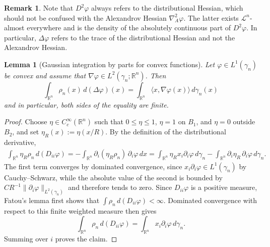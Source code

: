 \documentclass[11pt]{amsart}
\newtheorem{lemma}[lemma]{Lemma}
\theoremstyle{definition}
\newtheorem{remark}[remark]{Remark}
\newcommand{\R}{\mathbb{R}}
\newcommand{\tr}{\operatorname{tr}}
\begin{document}

\begin{remark}
Note that $D^2\varphi$ always refers to the
distributional Hessian, which should not be confused
with the Alexandrov Hessian $\nabla_A^2\varphi$. The latter  exists
$\mathcal L^n$-almost everywhere and is the density of the absolutely
continuous part of $D^2\varphi$. In particular, $\Delta\varphi$ refers to the trace of the distributional Hessian and not the Alexandrov Hessian.    
\end{remark}



\begin{lemma}[Gaussian integration by parts for convex functions]\label{lem:GaussPartInt}
Let $\varphi \in L^1(\gamma_n)$ be convex and assume that
$\nabla\varphi\in L^2(\gamma_n;\mathbb R^n)$. Then
\[
    \int_{\mathbb R^n} \rho_n(x)\,d(\Delta\varphi)(x)
    =
    \int_{\mathbb R^n}
        \langle x,\nabla\varphi(x)\rangle\,d\gamma_n(x)
\]
and in particular, both sides of the equality are finite. 
\end{lemma}
\begin{proof}
Choose $\eta\in C_c^\infty(\R^n)$ such that $0\leq\eta\leq1$,
$\eta=1$ on $B_1$, and $\eta=0$ outside $B_2$, and set
$\eta_R(x):=\eta(x/R)$. By the definition of the distributional
derivative,
\begin{align*}
  \int_{\R^n}\eta_R\rho_n\,d(D_{ii}\varphi)
  =-\int_{\R^n}\partial_i(\eta_R\rho_n)\,
    \partial_i\varphi\,dx
  =\int_{\R^n}\eta_R x_i\partial_i\varphi\,d\gamma_n
    -\int_{\R^n}\partial_i\eta_R\,\partial_i\varphi\,d\gamma_n.
\end{align*}
The first term converges by dominated convergence, since
$x_i\partial_i\varphi\in L^1(\gamma_n)$ by Cauchy--Schwarz, while the
absolute value of the second is bounded by
$C R^{-1}\|\partial_i\varphi\|_{L^2(\gamma_n)}$ and therefore tends to
zero. Since $D_{ii}\varphi$ is a positive measure, Fatou's lemma first
shows that $\int\rho_n\,d(D_{ii}\varphi)<\infty$. Dominated convergence
with respect to this finite weighted measure then gives
\[
  \int_{\R^n}\rho_n\,d(D_{ii}\varphi)
  =\int_{\R^n}x_i\partial_i\varphi\,d\gamma_n.
\]
Summing over $i$ proves the claim.
\end{proof}
\end{document}
